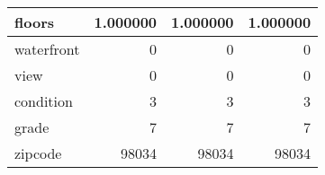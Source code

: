 \begin{table}[H]
\begin{tabular}{|l|r|r|r|}
\hline floors & \cellcolor[rgb]{0.9, 0.54, 0.52} 1.000000 & \cellcolor[rgb]{0.9, 0.54, 0.52} 1.000000 & \cellcolor[rgb]{0.9, 0.54, 0.52} 1.000000 \\
\hline waterfront & \cellcolor[rgb]{0.9, 0.54, 0.52} 0 & \cellcolor[rgb]{0.9, 0.54, 0.52} 0 & \cellcolor[rgb]{0.9, 0.54, 0.52} 0 \\
\hline view & \cellcolor[rgb]{0.9, 0.54, 0.52} 0 & \cellcolor[rgb]{0.9, 0.54, 0.52} 0 & \cellcolor[rgb]{0.9, 0.54, 0.52} 0 \\
\hline condition & \cellcolor[rgb]{0.9, 0.54, 0.52} 3 & \cellcolor[rgb]{0.9, 0.54, 0.52} 3 & \cellcolor[rgb]{0.9, 0.54, 0.52} 3 \\
\hline grade & \cellcolor[rgb]{0.9, 0.54, 0.52} 7 & \cellcolor[rgb]{0.9, 0.54, 0.52} 7 & \cellcolor[rgb]{0.9, 0.54, 0.52} 7 \\
\hline zipcode & \cellcolor[rgb]{0.9, 0.54, 0.52} 98034 & \cellcolor[rgb]{0.9, 0.54, 0.52} 98034 & \cellcolor[rgb]{0.9, 0.54, 0.52} 98034 \\
\hline
\end{tabular}
\end{table}
